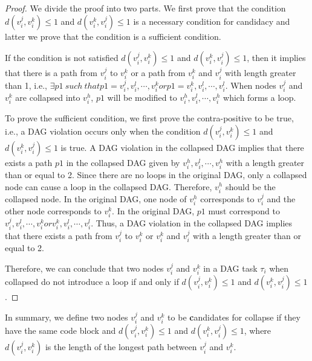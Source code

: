 \begin{proof}
We divide the proof into two parts. We first prove that the condition $d(v_i^j, v_i^k) \le 1$ and $d(v_i^k, v_i^j) \le 1$ is a necessary condition for candidacy and latter we prove that the condition is a sufficient condition.

If the condition is not satisfied $d(v_i^j, v_i^k) \le 1$ and $d(v_i^k, v_i^j) \le 1$, then it implies that there is a path from $v_i^j$ to $v_i^k$ or a path from $v_i^k$ and $v_i^j$ with length greater than 1, i.e., $\exists p1 \  such \  that p1 = {v_i^j, v_i^l, \cdots , v_i^k} or p1 = {v_i^k, v_i^l, \cdots , v_i^l}$. When nodes $v_i^j$ and $v_i^k$ are collapsed into $v_i^h$, $p1$ will be modified to ${v_i^h, v_i^l, \cdots , v_i^h}$ which forms a loop. 

To prove the sufficient condition, we first prove the contra-positive to be true, i.e., a DAG violation occurs only when the condition $d(v_i^j, v_i^k) \le 1$ and $d(v_i^k, v_i^j) \le 1$ is true. A DAG violation in the collapsed DAG implies that there exists a path $p1$ in the collapsed DAG given by $v_i^h, v_i^l, \cdots , v_i^h$ with a length greater than or equal to 2.  Since there are no loops in the original DAG, only a collapsed node can cause a loop in the collapsed DAG. Therefore, $v_i^h$ should be the collapsed node. In the original DAG, one node of $v_i^h$ corresponds to $v_i^j$ and the other node corresponds to $v_i^k$. In the original DAG, $p1$ must correspond to ${v_i^j, v_i^l, \cdots , v_i^k} or {v_i^k, v_i^l, \cdots , v_i^l}$. Thus, a DAG violation in the collapsed DAG implies that there exists a path from $v_i^j$ to $v_i^k$  or $v_i^k$ and $v_i^j$ with a length greater than or equal to 2. 

Therefore, we can conclude that two nodes $v_i^j$ and $v_i^k$ in a DAG task $\tau_i$ when collapsed do not introduce a loop if and only if $d(v_i^j, v_i^k) \le 1$ and $d(v_i^k, v_i^j) \le 1$.
\end{proof}

In summary, we define two nodes $v_i^j$ and $v_i^k$ to be {\textbf candidates for collapse} if they have the same code block and $d(v_i^j, v_i^k) \le 1$ and $d(v_i^k, v_i^j) \le 1$, where $d(v_i^j, v_i^k)$ is the length of the longest path between $v_i^j$ and $v_i^k$.
